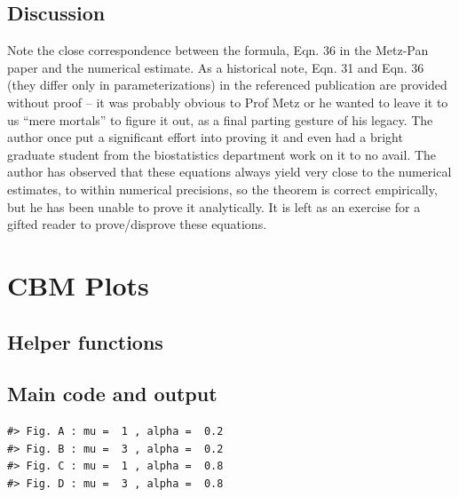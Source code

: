 \documentclass[
]{book}
\begin{document}
\hypertarget{discussion-1}{%
\section{Discussion}\label{discussion-1}}

Note the close correspondence between the formula, Eqn. 36 in the Metz-Pan paper and the numerical estimate. As a historical note, Eqn. 31 and Eqn. 36 (they differ only in parameterizations) in the referenced publication are provided without proof -- it was probably obvious to Prof Metz or he wanted to leave it to us ``mere mortals'' to figure it out, as a final parting gesture of his legacy. The author once put a significant effort into proving it and even had a bright graduate student from the biostatistics department work on it to no avail. The author has observed that these equations always yield very close to the numerical estimates, to within numerical precisions, so the theorem is correct empirically, but he has been unable to prove it analytically. It is left as an exercise for a gifted reader to prove/disprove these equations.

\hypertarget{CbmPlots}{%
\chapter{CBM Plots}\label{CbmPlots}}

\hypertarget{helper-functions-2}{%
\section{Helper functions}\label{helper-functions-2}}

\hypertarget{main-code-and-output-2}{%
\section{Main code and output}\label{main-code-and-output-2}}

\begin{verbatim}
#> Fig. A : mu =  1 , alpha =  0.2
#> Fig. B : mu =  3 , alpha =  0.2
#> Fig. C : mu =  1 , alpha =  0.8
#> Fig. D : mu =  3 , alpha =  0.8
\end{verbatim}
\end{document}
